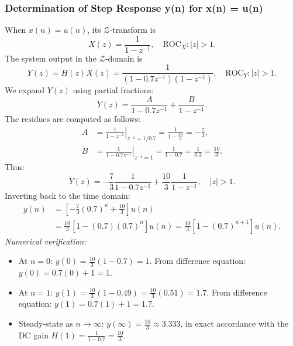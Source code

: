 \documentclass[12pt,a4paper]{article}
\begin{document}
\subsubsection{Determination of Step Response y(n) for x(n) = u(n)}
When $x(n) = u(n)$, its $\mathcal{Z}$-transform is
\begin{equation}
    X(z) = \frac{1}{1 - z^{-1}}, \quad \text{ROC}_X: |z| > 1.
\end{equation}
The system output in the $\mathcal{Z}$-domain is
\begin{equation}
    Y(z) = H(z) X(z) = \frac{1}{(1 - 0.7 z^{-1})(1 - z^{-1})}, \quad \text{ROC}_Y: |z| > 1.
\end{equation}
We expand $Y(z)$ using partial fractions:
\begin{equation}
    Y(z) = \frac{A}{1 - 0.7 z^{-1}} + \frac{B}{1 - z^{-1}}.
\end{equation}
The residues are computed as follows:
\begin{align*}
    A &= \left. \frac{1}{1 - z^{-1}} \right|_{z^{-1} = 1/0.7} = \frac{1}{1 - \frac{10}{7}} = -\frac{7}{3}, \\
    B &= \left. \frac{1}{1 - 0.7 z^{-1}} \right|_{z^{-1} = 1} = \frac{1}{1 - 0.7} = \frac{1}{0.3} = \frac{10}{3}.
\end{align*}
Thus:
\begin{equation}
    Y(z) = -\frac{7}{3} \frac{1}{1 - 0.7 z^{-1}} + \frac{10}{3} \frac{1}{1 - z^{-1}}, \quad |z| > 1.
\end{equation}
Inverting back to the time domain:
\begin{align}
    y(n) &= \left[ -\frac{7}{3}(0.7)^n + \frac{10}{3} \right] u(n) \nonumber \\
         &= \frac{10}{3}\left[ 1 - (0.7)(0.7)^n \right] u(n) = \frac{10}{3}\left[ 1 - (0.7)^{n+1} \right] u(n).
\end{align}
\textit{Numerical verification:}
\begin{itemize}
    \item At $n=0$: $y(0) = \frac{10}{3}(1 - 0.7) = 1$. From difference equation: $y(0) = 0.7(0) + 1 = 1$.
    \item At $n=1$: $y(1) = \frac{10}{3}(1 - 0.49) = \frac{10}{3}(0.51) = 1.7$. From difference equation: $y(1) = 0.7(1) + 1 = 1.7$.
    \item Steady-state as $n \to \infty$: $y(\infty) = \frac{10}{3} \approx 3.333$, in exact accordance with the DC gain $H(1) = \frac{1}{1 - 0.7} = \frac{10}{3}$.
\end{itemize}
\end{document}
